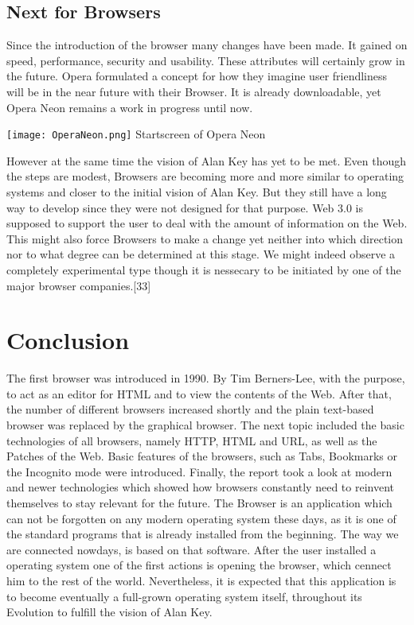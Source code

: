 \documentclass[runningheads]{llncs}
\begin{document}
		\subsection{Next for Browsers}
			Since the introduction of the browser many changes have been made. It gained on speed, performance, security and usability. These attributes will certainly grow in the future.
			Opera formulated a concept for how they imagine user friendliness will be in the near future with their Browser. It is already downloadable, yet Opera Neon remains a work in progress until now.
		 	\begin{center}
		 		\texttt{[image: OperaNeon.png]}
		 		Startscreen of Opera Neon
		 	\end{center}
		 	
		 	However at the same time the vision of Alan Key has yet to be met.
			Even though the steps are modest, Browsers are becoming more and more similar to operating systems and closer to the initial vision of Alan Key. But they still have a long way to develop since they were not designed for that purpose.
			\newline
			Web 3.0 is supposed to support the user to deal with the amount of information on the Web. This might also force Browsers to make a change yet neither into which direction nor to what degree can be determined at this stage. We might indeed observe a completely experimental type though it is nessecary to be initiated by one of the major browser companies.[33]
	\section{Conclusion}	
	The first browser was introduced in 1990. By Tim Berners-Lee, with the purpose, to act as an editor for HTML and to view the contents of the Web. After that, the number of different browsers increased shortly and the plain text-based browser was replaced by the graphical browser. The next topic included the basic technologies of all browsers, namely HTTP, HTML and URL, as well as the Patches of the Web. Basic features of the browsers, such as Tabs, Bookmarks or the Incognito mode were introduced. Finally, the report took a look at modern and newer technologies which showed how browsers constantly need to reinvent themselves to stay relevant for the future.
	The Browser is an application which can not be forgotten on any modern operating system these days, as it is one of the standard programs that is already installed from the beginning. The way we are connected nowdays, is based on that software. After the user installed a operating system one of the first actions is opening the browser, which cennect him to the rest of the world.
	\newline
	Nevertheless, it is expected that this application is to become eventually a full-grown operating system itself, throughout its Evolution to fulfill the vision of Alan Key.
\end{document}
